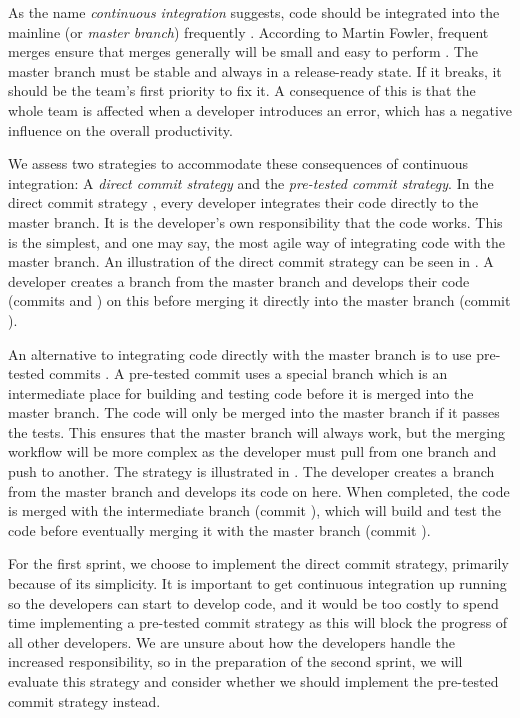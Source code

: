 As the name \emph{continuous integration} suggests, code should be integrated into the mainline (or \emph{master branch}) frequently \parencite{fowlerCI}. According to Martin Fowler, frequent merges ensure that merges generally will be small and easy to perform \parencite{fowlerFeatureBranch}. The master branch must be stable and always in a release-ready state. If it breaks, it should be the team's first priority to fix it. A consequence of this is that the whole team is affected when a developer introduces an error, which has a negative influence on the overall productivity.

We assess two strategies to accommodate these consequences of continuous integration: A \emph{direct commit strategy} and the \emph{pre-tested commit strategy}. In the direct commit strategy \parencite{git_branching_workflows2015}, every developer integrates their code directly to the master branch. It is the developer's own responsibility that the code works. This is the simplest, and one may say, the most agile way of integrating code with the master branch. An illustration of the direct commit strategy can be seen in . A developer creates a branch from the master branch and develops their code (commits  and ) on this before merging it directly into the master branch (commit ).

An alternative to integrating code directly with the master branch is to use pre-tested commits \parencite{fowlerPendingHead}. A pre-tested commit uses a special branch which is an intermediate place for building and testing code before it is merged into the master branch. The code will only be merged into the master branch if it passes the tests. This ensures that the master branch will always work, but the merging workflow will be more complex as the developer must pull from one branch and push to another. The strategy is illustrated in . The developer creates a branch from the master branch and develops its code on here. When completed, the code is merged with the intermediate branch (commit \emph{}), which will build and test the code before eventually merging it with the master branch (commit ).

For the first sprint, we choose to implement the direct commit strategy, primarily because of its simplicity. It is important to get continuous integration up running so the developers can start to develop code, and it would be too costly to spend time implementing a pre-tested commit strategy as this will block the progress of all other developers. We are unsure about how the developers handle the increased responsibility, so in the preparation of the second sprint, we will evaluate this strategy and consider whether we should implement the pre-tested commit strategy instead.

